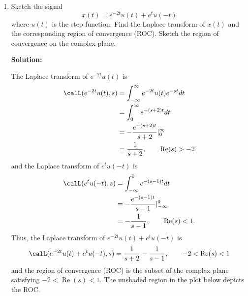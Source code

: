 \documentclass[11pt,a4paper]{book}
\theoremstyle{plain}
\numberwithin{equation}{section}
\renewcommand{\Re}{\operatorname{Re}}
\renewcommand{\Im}{\operatorname{Im}}
\newcommand{\vtick}[1]{\draw (#1,-0.075) -- (#1,0.075) }
\newenvironment{solution}{\begin{footnotesize}\textbf{Solution:}}{\end{footnotesize}}
\newenvironment{excersizelist}{%
  \renewcommand*{\theenumi}{\thechapter.\arabic{enumi}}%
  \newcommand\itemadvanced{\stepcounter{enumi}\item[$\ast$\, \theenumi.]}
  \begin{enumerate}
}{%
  \end{enumerate}
}
\begin{document}
\begin{excersizelist}

\item Sketch the signal
\[
x(t) = e^{-2t} u(t) + e^{t} u(-t)
\]
where $u(t)$ is the step function.  Find the Laplace transform of $x(t)$ and the corresponding region of convergence (ROC).  Sketch the region of convergence on the complex plane.
\begin{solution}
\begin{center}
\end{center}

The Laplace transform of $e^{-2t}u(t)$ is
\begin{align*}
\calL(e^{-2t}u(t), s) &= \int_{-\infty}^{\infty} e^{-2t}u(t) e^{-st} dt \\
&= \int_{0}^{\infty} e^{-(s+2)t} dt \\
&= -\frac{e^{-(s+2)t}}{s+2} \vert_{0}^\infty \\
&= \frac{1}{s+2}, \qquad \Re(s) > -2
\end{align*}
and the Laplace transform of $e^{t}u(-t)$ is
\begin{align*}
\calL(e^{t}u(-t), s) &= \int_{-\infty}^{0} e^{-(s-1)t} dt \\
&= -\frac{e^{-(s-1)t}}{s-1} \vert_{-\infty}^0 \\
&= -\frac{1}{s-1}, \qquad \Re(s) < 1.
\end{align*}
Thus, the Laplace transform of $e^{-2t} u(t) + e^{t} u(-t)$ is
\[
\calL(e^{-2t} u(t) + e^{t} u(-t), s) = \frac{1}{s+2} - \frac{1}{s-1}, \qquad -2 < \Re(s) < 1
\]
and the region of convergence (ROC) is the subset of the complex plane satisfying $-2 < \Re(s) < 1$.  The unshaded region in the plot below depicts the ROC.

\begin{center}
\end{center}
\end{solution}


\end{excersizelist}
\end{document}
